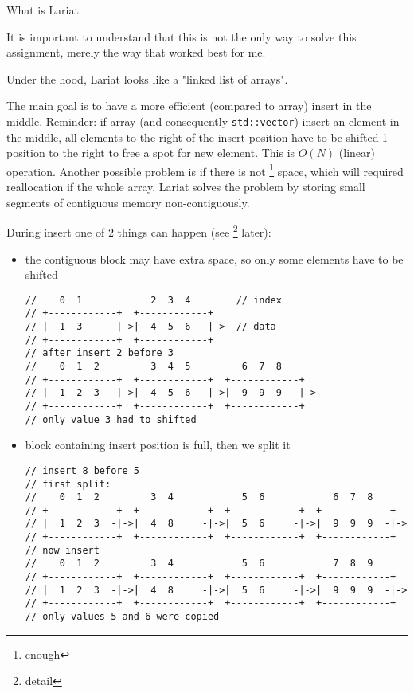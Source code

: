 
\begin{section}{What is Lariat}

 \begin{displayquote}
	 It is important to understand that this is not the only way to solve this
	 assignment, merely the way that worked best for me.
 \end{displayquote}

 \indent Under the hood, Lariat looks like a "linked list of arrays".

 \indent The main goal is to have a more efficient (compared to array) insert in the
 middle.
 Reminder: if array (and consequently \texttt{std::vector}) insert an element
 in the middle, all elements to the right of the insert position have to be
 shifted 1 position to the right to free a spot for new element. This is $O(N)$ (linear) operation. Another possible problem is if there is not \footnote{enough} space,
 which will required reallocation if the whole array.
 Lariat solves the problem by storing small segments of contiguous memory non-contiguously.


 During insert one of $2$ things can happen (see \footnote{detail} later):
 \begin{itemize}
	 \item the contiguous block may have extra space, so only some elements have to be shifted
	       \begin{verbatim}
//    0  1            2  3  4        // index
// +------------+  +------------+
// |  1  3     -|->|  4  5  6  -|->  // data
// +------------+  +------------+
// after insert 2 before 3
//    0  1  2         3  4  5         6  7  8
// +------------+  +------------+  +------------+
// |  1  2  3  -|->|  4  5  6  -|->|  9  9  9  -|->
// +------------+  +------------+  +------------+
// only value 3 had to shifted
	\end{verbatim}

	 \item block containing insert position is full, then we split it
	       \begin{verbatim}
// insert 8 before 5
// first split:
//    0  1  2         3  4            5  6            6  7  8       
// +------------+  +------------+  +------------+  +------------+  
// |  1  2  3  -|->|  4  8     -|->|  5  6     -|->|  9  9  9  -|->
// +------------+  +------------+  +------------+  +------------+  
// now insert
//    0  1  2         3  4            5  6            7  8  9       
// +------------+  +------------+  +------------+  +------------+    
// |  1  2  3  -|->|  4  8     -|->|  5  6     -|->|  9  9  9  -|->
// +------------+  +------------+  +------------+  +------------+    
// only values 5 and 6 were copied
			\end{verbatim}
 \end{itemize}


\end{section}
